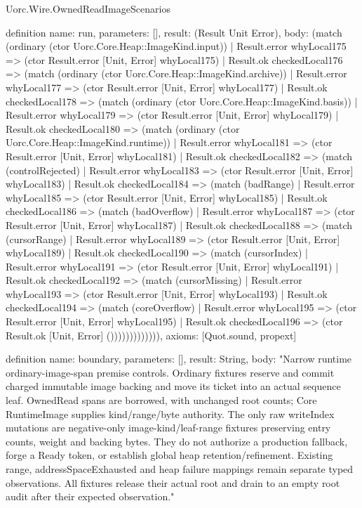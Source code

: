 \begin{lexlean}{Uorc.Wire.OwnedReadImageScenarios}
\begin{semanticmodule}
definition{
  name: run,
  parameters: [],
  result: (Result Unit Error),
  body: (match (ordinary (ctor Uorc.Core.Heap::ImageKind.input))
    | Result.error whyLocal175 => (ctor Result.error [Unit, Error] whyLocal175)
    | Result.ok checkedLocal176 => (match (ordinary (ctor Uorc.Core.Heap::ImageKind.archive))
      | Result.error whyLocal177 => (ctor Result.error [Unit, Error] whyLocal177)
      | Result.ok checkedLocal178 => (match (ordinary (ctor Uorc.Core.Heap::ImageKind.basis))
        | Result.error whyLocal179 => (ctor Result.error [Unit, Error] whyLocal179)
        | Result.ok checkedLocal180 => (match (ordinary (ctor Uorc.Core.Heap::ImageKind.runtime))
          | Result.error whyLocal181 => (ctor Result.error [Unit, Error] whyLocal181)
          | Result.ok checkedLocal182 => (match (controlRejected)
            | Result.error whyLocal183 => (ctor Result.error [Unit, Error] whyLocal183)
            | Result.ok checkedLocal184 => (match (badRange)
              | Result.error whyLocal185 => (ctor Result.error [Unit, Error] whyLocal185)
              | Result.ok checkedLocal186 => (match (badOverflow)
                | Result.error whyLocal187 => (ctor Result.error [Unit, Error] whyLocal187)
                | Result.ok checkedLocal188 => (match (cursorRange)
                  | Result.error whyLocal189 => (ctor Result.error [Unit, Error] whyLocal189)
                  | Result.ok checkedLocal190 => (match (cursorIndex)
                    | Result.error whyLocal191 => (ctor Result.error [Unit, Error] whyLocal191)
                    | Result.ok checkedLocal192 => (match (cursorMissing)
                      | Result.error whyLocal193 => (ctor Result.error [Unit, Error] whyLocal193)
                      | Result.ok checkedLocal194 => (match (coreOverflow)
                        | Result.error whyLocal195 => (ctor Result.error [Unit, Error] whyLocal195)
                        | Result.ok checkedLocal196 => (ctor Result.ok [Unit, Error] ())))))))))))),
  axioms: [Quot.sound, propext]
}

definition{
  name: boundary,
  parameters: [],
  result: String,
  body: "Narrow runtime ordinary-image-span premise controls. Ordinary fixtures reserve and commit charged immutable image backing and move its ticket into an actual sequence leaf. OwnedRead spans are borrowed, with unchanged root counts; Core RuntimeImage supplies kind/range/byte authority. The only raw writeIndex mutations are negative-only image-kind/leaf-range fixtures preserving entry counts, weight and backing bytes. They do not authorize a production fallback, forge a Ready token, or establish global heap retention/refinement. Existing range, addressSpaceExhausted and heap failure mappings remain separate typed observations. All fixtures release their actual root and drain to an empty root audit after their expected observation."
}
\end{semanticmodule}
\end{lexlean}
